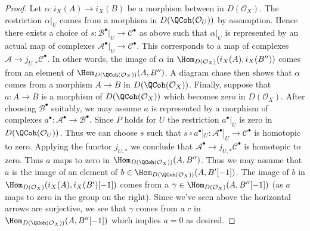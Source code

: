 \begin{proof}
\medskip\noindent
Let $\alpha : i_X(A) \to i_X(B)$ be a morphism between
in $D(\mathcal{O}_X)$. The restriction $\alpha|_U$ comes from a
morphism in $D(\QCoh(\mathcal{O}_U))$ by assumption.
Hence there exists a choice of
$s : \mathcal{B}^\bullet|_U \to \mathcal{C}^\bullet$ as above
such that $\alpha|_U$ is represented by an actual map of complexes
$\mathcal{A}^\bullet|_U \to \mathcal{C}^\bullet$.
This corresponds to a map of complexes
$\mathcal{A} \to j_{U, *}\mathcal{C}^\bullet$.
In other words, the image of $\alpha$ in
$\Hom_{D(\mathcal{O}_X)}(i_X(A), i_X(B''))$ comes from
an element of $\Hom_{D(\QCoh(\mathcal{O}_X))}(A, B'')$.
A diagram chase then shows that $\alpha$ comes from a morphism
$A \to B$ in $D(\QCoh(\mathcal{O}_X))$. Finally, suppose
that $a : A \to B$ is a morphism of $D(\QCoh(\mathcal{O}_X))$
which becomes zero in $D(\mathcal{O}_X)$. After choosing $\mathcal{B}^\bullet$
suitably, we may assume $a$ is represented by a morphism of complexes
$a^\bullet : \mathcal{A}^\bullet \to \mathcal{B}^\bullet$.
Since $P$ holds for $U$ the restriction $a^\bullet|_U$ is zero
in $D(\QCoh(\mathcal{O}_U))$. Thus we can choose $s$
such that
$s \circ a^\bullet|_U : \mathcal{A}^\bullet|_U \to \mathcal{C}^\bullet$
is homotopic to zero. Applying the functor $j_{U, *}$ we conclude that
$\mathcal{A}^\bullet \to j_{U, *}\mathcal{C}^\bullet$ is homotopic
to zero. Thus $a$ maps to zero in
$\Hom_{D(\QCoh(\mathcal{O}_X))}(A, B'')$.
Thus we may assume that $a$ is the image of an element
of $b \in \Hom_{D(\QCoh(\mathcal{O}_X))}(A, B'[-1])$.
The image of $b$ in $\Hom_{D(\mathcal{O}_X)}(i_X(A), i_X(B')[-1])$
comes from a $\gamma \in \Hom_{D(\mathcal{O}_X)}(A, B''[-1])$
(as $a$ maps to zero in the group on the right). Since we've
seen above the horizontal arrows are surjective, we see
that $\gamma$ comes from a $c$ in
$\Hom_{D(\QCoh(\mathcal{O}_X))}(A, B''[-1])$
which implies $a = 0$ as desired.


\end{proof}
